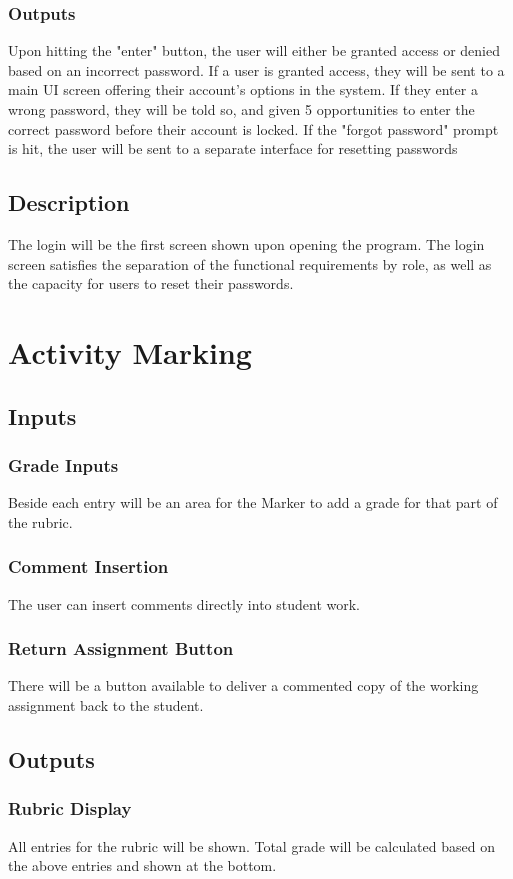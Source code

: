 \documentclass{article}
\begin{document}
\subsubsection{Outputs}
Upon hitting the "enter" button, the user will either be granted access or denied based
on an incorrect password. If a user is granted access, they will be sent
to a main UI screen offering their account's options in the system. If they enter a wrong
password, they will be told so, and given 5 opportunities to enter the correct password
before their account is locked. If the "forgot password" prompt is hit, the user will be sent
to a separate interface for resetting passwords
\subsection{Description}
The login will be the first screen shown upon opening the program. The login screen 
satisfies the separation of the functional requirements by role, as well as the capacity for users
to reset their passwords.

\section{Activity Marking}
\subsection{Inputs}
\subsubsection{Grade Inputs}
Beside each entry will be an
area for the Marker to add a grade for that part of the rubric.
\subsubsection{Comment Insertion}
The user can insert comments directly into student work.
\subsubsection{Return Assignment Button}
There will be a button available to deliver a commented copy of the working
assignment back to the student.
\subsection{Outputs}
\subsubsection{Rubric Display}
All entries for the rubric will be shown.
Total grade will be calculated based on the above entries and shown at the
bottom.
\end{document}
